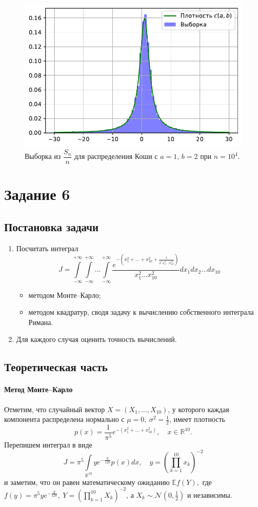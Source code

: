 \documentclass[16pt]{article}
\newcommand\Real{\mathbb{R}}
\begin{document}
\begin{figure}[h]
	\center
	\includegraphics[scale=0.7]{5_6.pdf}
	\caption{Выборка из $\dfrac{S_n}{n}$ для распределения Коши с $a = 1, \, b = 2$ при $n = 10^4$.}
\end{figure}

\section{Задание 6}
\subsection{Постановка задачи}
\begin{enumerate}
\item Посчитать интеграл
$$J = \int\limits_{-\infty}^{+\infty}\int\limits_{-\infty}^{+\infty}\ldots\int\limits_{-\infty}^{+\infty} \dfrac{e^{-\left(x_1^2 + \ldots + x_{10}^2 + \frac{1}{2^7x_1^2\ldots x_{10}^2}\right)}}{x_1^2\ldots x_{10}^2}dx_1dx_2\ldots dx_{10}$$
\begin{itemize}
	\item методом Монте--Карло;
	\item методом квадратур, сводя задачу к вычислению собственного интеграла Римана.
\end{itemize} 
\item Для каждого случая оценить точность вычислений.
\end{enumerate}

\subsection{Теоретическая часть}
\paragraph{Метод Монте--Карло} Отметим, что случайный вектор $X = (X_1, \ldots, X_{10})$, у которого каждая компонента распределена нормально с $\mu = 0,\ \sigma^2 = \frac12$, имеет плотность
$$p(x) = \frac{1}{\pi^5}e^{-(x_1^2 + \ldots + x_{10}^2)}, \quad x \in \Real^{10}.$$
Перепишем интеграл в виде
$$ J = \pi^5 \int\limits_{\mathbb{R}^{10}} ye^{-\frac{y}{128}}p(x)dx, \quad y = \left(\prod_{k=1}^{10} x_k\right)^{-2}$$
и заметим, что он равен математическому ожиданию
$\mathbb{E}f(Y),$
где $f(y) = \pi^5 y e^{-\frac{y}{128}},\ Y = \left(\prod_{k=1}^{10} X_k\right)^{-2}$, а $X_k \sim \mathcal{N}\left(0, \frac12\right)$ и независимы.
\end{document}
